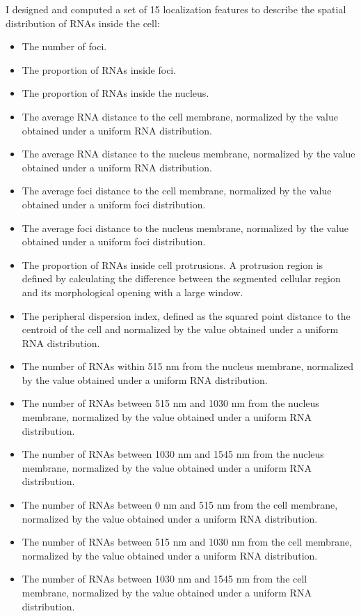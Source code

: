 I designed and computed a set of 15 localization features to describe the spatial distribution of RNAs inside the cell:
\begin{itemize}
	\setlength\itemsep{0.1em}
	\item The number of foci.
	\item The proportion of \ac{RNA}s inside foci.
	\item The proportion of \ac{RNA}s inside the nucleus.
	\item The average \ac{RNA} distance to the cell membrane, normalized by the value obtained under a uniform \ac{RNA} distribution.
	\item The average \ac{RNA} distance to the nucleus membrane, normalized by the value obtained under a uniform \ac{RNA} distribution.
	\item The average foci distance to the cell membrane, normalized by the value obtained under a uniform foci distribution.
	\item The average foci distance to the nucleus membrane, normalized by the value obtained under a uniform foci distribution.
	\item The proportion of \ac{RNA}s inside cell protrusions.
	A protrusion region is defined by calculating the difference between the segmented cellular region and its morphological opening with a large window.
	\item The peripheral dispersion index, defined as the squared point distance to the centroid of the cell and normalized by the value obtained under a uniform \ac{RNA} distribution.
	\item The number of \ac{RNA}s within 515 nm from the nucleus membrane, normalized by the value obtained under a uniform \ac{RNA} distribution.
	\item The number of \ac{RNA}s between 515 nm and 1030 nm from the nucleus membrane, normalized by the value obtained under a uniform \ac{RNA} distribution.
	\item The number of \ac{RNA}s between 1030 nm and 1545 nm from the nucleus membrane, normalized by the value obtained under a uniform \ac{RNA} distribution.
	\item The number of \ac{RNA}s between 0 nm and 515 nm from the cell membrane, normalized by the value obtained under a uniform \ac{RNA} distribution.
	\item The number of \ac{RNA}s between 515 nm and 1030 nm from the cell membrane, normalized by the value obtained under a uniform \ac{RNA} distribution.
	\item The number of \ac{RNA}s between 1030 nm and 1545 nm from the cell membrane, normalized by the value obtained under a uniform \ac{RNA} distribution.
\end{itemize}

